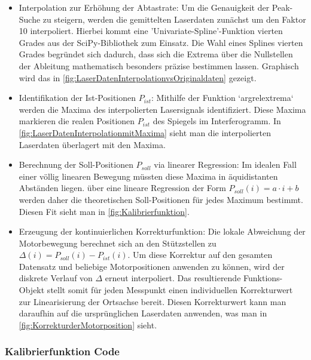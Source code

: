 \documentclass[10pt,a4paper]{article}
\begin{document}
\begin{itemize}
       \item Interpolation zur Erhöhung der Abtastrate: Um die Genauigkeit der Peak-Suche zu steigern, werden die gemittelten Laserdaten zunächst um den Faktor 10 interpoliert. Hierbei kommt eine 'Univariate-Spline'-Funktion vierten Grades aus der SciPy-Bibliothek zum Einsatz. Die Wahl eines Splines vierten Grades begründet sich dadurch, dass sich die Extrema über die Nullstellen der Ableitung mathematisch besonders präzise bestimmen lassen. Graphisch wird das in \autoref{fig:LaserDatenInterpolationvsOriginaldaten} gezeigt.
       \item Identifikation der Ist-Positionen $P_{ist}$: Mithilfe der Funktion `argrelextrema` werden die Maxima des interpolierten Lasersignals identifiziert. Diese Maxima markieren die realen Positionen $P_{ist}$ des Spiegels im Interferogramm. In \autoref{fig:LaserDatenInterpolationmitMaxima} sieht man die interpolierten Laserdaten überlagert mit den Maxima.
       \item Berechnung der Soll-Positionen $P_{soll}$ via linearer Regression: Im idealen Fall einer völlig linearen Bewegung müssten diese Maxima in äquidistanten Abständen liegen. über eine lineare Regression der Form $P_{soll}(i)=a\cdot i+b$ werden daher die theoretischen Soll-Positionen für jedes Maximum bestimmt. Diesen Fit sieht man in \autoref{fig:Kalibrierfunktion}.
       \item Erzeugung der kontinuierlichen Korrekturfunktion: Die lokale Abweichung der Motorbewegung berechnet sich an den Stützstellen zu $\Delta(i)=P_{soll}(i)-P_{ist}(i)$. Um diese Korrektur auf den gesamten Datensatz und beliebige Motorpositionen anwenden zu können, wird der diskrete Verlauf von $\Delta$ erneut interpoliert. Das resultierende Funktions-Objekt stellt somit für jeden Messpunkt einen individuellen Korrekturwert zur Linearisierung der Ortsachse bereit. Diesen Korrekturwert kann man daraufhin auf die ursprünglichen Laserdaten anwenden, was man in \autoref{fig:KorrekturderMotorposition} sieht.
\end{itemize}

\subsubsection{Kalibrierfunktion Code}
\end{document}
